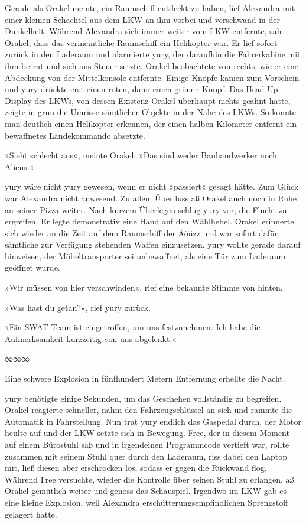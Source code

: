 Gerade als Orakel meinte, ein Raumschiff entdeckt zu haben, lief Alexandra mit einer kleinen Schachtel aus dem LKW an ihm vorbei und verschwand in der Dunkelheit. Während Alexandra sich immer weiter vom LKW entfernte, sah Orakel, dass das vermeintliche Raumschiff ein Helikopter war. Er lief sofort zurück in den Laderaum und alarmierte yury, der daraufhin die Fahrerkabine mit ihm betrat und sich ans Steuer setzte. Orakel beobachtete von rechts, wie er eine Abdeckung von der Mittelkonsole entfernte. Einige Knöpfe kamen zum Vorschein und yury drückte erst einen roten, dann einen grünen Knopf. Das Head-Up-Display des LKWs, von dessen Existenz Orakel überhaupt nichts geahnt hatte, zeigte in grün die Umrisse sämtlicher Objekte in der Nähe des LKWs. So konnte man deutlich einen Helikopter erkennen, der einen halben Kilometer entfernt ein bewaffnetes Landekommando absetzte.

»Sieht schlecht aus«, meinte Orakel. »Das sind weder Bauhandwerker noch Aliens.«

yury wäre nicht yury gewesen, wenn er nicht »passiert« gesagt hätte. Zum Glück war Alexandra nicht anwesend. Zu allem Überfluss aß Orakel auch noch in Ruhe an seiner Pizza weiter. Nach kurzem Überlegen schlug yury vor, die Flucht zu ergreifen. Er legte demonstrativ eine Hand auf den Wählhebel. Orakel erinnerte sich wieder an die Zeit auf dem Raumschiff der Äöüzz und war sofort dafür, sämtliche zur Verfügung stehenden Waffen einzusetzen. yury wollte gerade darauf hinweisen, der Möbeltransporter sei unbewaffnet, als eine Tür zum Laderaum geöffnet wurde.

»Wir müssen von hier verschwinden«, rief eine bekannte Stimme von hinten.

»Was hast du getan?«, rief yury zurück.

»Ein SWAT-Team ist eingetroffen, um uns festzunehmen. Ich habe die Aufmerksamkeit kurzzeitig von uns abgelenkt.«

\begin{center}
	∞∞∞
\end{center}

Eine schwere Explosion in fünfhundert Metern Entfernung erhellte die Nacht.

yury benötigte einige Sekunden, um das Geschehen vollständig zu begreifen. Orakel reagierte schneller, nahm den Fahrzeugschlüssel an sich und rammte die Automatik in Fahrstellung. Nun trat yury endlich das Gaspedal durch, der Motor heulte auf und der LKW setzte sich in Bewegung. Free, der in diesem Moment auf einem Bürostuhl saß und in irgendeinen Programmcode vertieft war, rollte zusammen mit seinem Stuhl quer durch den Laderaum, riss dabei den Laptop mit, ließ diesen aber erschrocken los, sodass er gegen die Rückwand flog. Während Free versuchte, wieder die Kontrolle über seinen Stuhl zu erlangen, aß Orakel gemütlich weiter und genoss das Schauspiel. Irgendwo im LKW gab es eine kleine Explosion, weil Alexandra erschütterungsempfindlichen Sprengstoff gelagert hatte.

